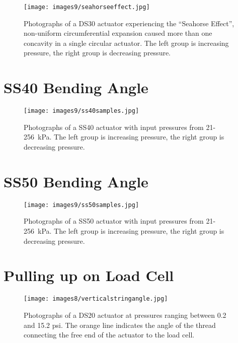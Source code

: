 \begin{figure}[ht]
    \centering
     \texttt{[image: images9/seahorseeffect.jpg]}
    \caption{Photographs of a DS30 actuator experiencing the ``Seahorse Effect'', non-uniform circumferential expansion caused more than one concavity in a single circular actuator. The left group is increasing pressure, the right group is decreasing pressure.}
    \label{fig:seahorseeffect}
\end{figure}

\chapter{SS40 Bending Angle}
\label{appendix:s40all}

\begin{figure}[ht]
    \centering
     \texttt{[image: images9/ss40samples.jpg]}
    \caption{Photographs of a SS40 actuator with input pressures from 21-256~kPa. The left group is increasing pressure, the right group is decreasing pressure.}
    \label{fig:ss40samples}
\end{figure}

\chapter{SS50 Bending Angle}
\label{appendix:s50all}
\begin{figure}[ht]
    \centering
     \texttt{[image: images9/ss50samples.jpg]}
    \caption{Photographs of a SS50 actuator with input pressures from 21-256~kPa. The left group is increasing pressure, the right group is decreasing pressure.}
    \label{fig:ss50samples}
\end{figure}

\chapter{Pulling up on Load Cell}
\label{appendix:pullinguploadcell}

\begin{figure}[ht]
    \centering
     \texttt{[image: images8/verticalstringangle.jpg]}
    \caption{Photographs of a DS20 actuator at pressures ranging between 0.2 and 15.2 psi. The orange line indicates the angle of the thread connecting the free end of the actuator to the load cell.}
    \label{fig:verticalstringangle}
\end{figure}